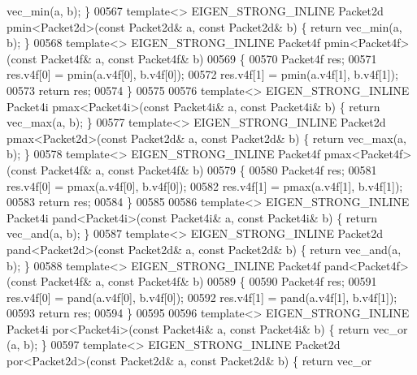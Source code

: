 \begin{DoxyCode}
{      vec\_min(a, b); \}
00567 \textcolor{keyword}{template}<> EIGEN\_STRONG\_INLINE Packet2d pmin<Packet2d>(\textcolor{keyword}{const} Packet2d& a, \textcolor{keyword}{const} Packet2d& b) \{ \textcolor{keywordflow}{return} 
      vec\_min(a, b); \}
00568 \textcolor{keyword}{template}<> EIGEN\_STRONG\_INLINE Packet4f pmin<Packet4f>(\textcolor{keyword}{const} Packet4f& a, \textcolor{keyword}{const} Packet4f& b)
00569 \{
00570   Packet4f res;
00571   res.v4f[0] = pmin(a.v4f[0], b.v4f[0]);
00572   res.v4f[1] = pmin(a.v4f[1], b.v4f[1]);
00573   \textcolor{keywordflow}{return} res;
00574 \}
00575 
00576 \textcolor{keyword}{template}<> EIGEN\_STRONG\_INLINE Packet4i pmax<Packet4i>(\textcolor{keyword}{const} Packet4i& a, \textcolor{keyword}{const} Packet4i& b) \{ \textcolor{keywordflow}{return} 
      vec\_max(a, b); \}
00577 \textcolor{keyword}{template}<> EIGEN\_STRONG\_INLINE Packet2d pmax<Packet2d>(\textcolor{keyword}{const} Packet2d& a, \textcolor{keyword}{const} Packet2d& b) \{ \textcolor{keywordflow}{return} 
      vec\_max(a, b); \}
00578 \textcolor{keyword}{template}<> EIGEN\_STRONG\_INLINE Packet4f pmax<Packet4f>(\textcolor{keyword}{const} Packet4f& a, \textcolor{keyword}{const} Packet4f& b)
00579 \{
00580   Packet4f res;
00581   res.v4f[0] = pmax(a.v4f[0], b.v4f[0]);
00582   res.v4f[1] = pmax(a.v4f[1], b.v4f[1]);
00583   \textcolor{keywordflow}{return} res;
00584 \}
00585 
00586 \textcolor{keyword}{template}<> EIGEN\_STRONG\_INLINE Packet4i pand<Packet4i>(\textcolor{keyword}{const} Packet4i& a, \textcolor{keyword}{const} Packet4i& b) \{ \textcolor{keywordflow}{return} 
      vec\_and(a, b); \}
00587 \textcolor{keyword}{template}<> EIGEN\_STRONG\_INLINE Packet2d pand<Packet2d>(\textcolor{keyword}{const} Packet2d& a, \textcolor{keyword}{const} Packet2d& b) \{ \textcolor{keywordflow}{return} 
      vec\_and(a, b); \}
00588 \textcolor{keyword}{template}<> EIGEN\_STRONG\_INLINE Packet4f pand<Packet4f>(\textcolor{keyword}{const} Packet4f& a, \textcolor{keyword}{const} Packet4f& b)
00589 \{
00590   Packet4f res;
00591   res.v4f[0] = pand(a.v4f[0], b.v4f[0]);
00592   res.v4f[1] = pand(a.v4f[1], b.v4f[1]);
00593   \textcolor{keywordflow}{return} res;
00594 \}
00595 
00596 \textcolor{keyword}{template}<> EIGEN\_STRONG\_INLINE Packet4i por<Packet4i>(\textcolor{keyword}{const} Packet4i& a, \textcolor{keyword}{const} Packet4i& b) \{ \textcolor{keywordflow}{return} vec\_or
      (a, b); \}
00597 \textcolor{keyword}{template}<> EIGEN\_STRONG\_INLINE Packet2d por<Packet2d>(\textcolor{keyword}{const} Packet2d& a, \textcolor{keyword}{const} Packet2d& b) \{ \textcolor{keywordflow}{return} vec\_or
}
\end{DoxyCode}
